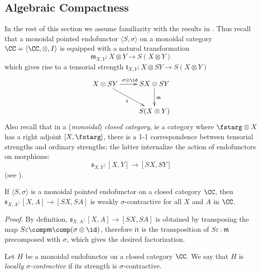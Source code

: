 \documentclass[11pt,a4paper]{article}
\newcommand{\tuple}[1]{\langle #1 \rangle }
\newcommand{\efunctor}{S}
\newcommand{\contr}{\sigma}
\newcommand{\pointedfunctor}{\tuple{\efunctor , \contr}}
\newcommand{\esse}{S}
\renewcommand{\strength}{\mathfrak{t}}
\newcommand{\stre}{\mathfrak{s}}
\newcommand{\monoi}{\mathfrak{m}}
\newcommand{\lolly}[2]{[#1 ,#2 ]}
\begin{document}
\subsection*{Algebraic Compactness}

In the rest of this section we assume
familiarity with the results in \cite{Kock}.
Thus recall that a monoidal pointed endofunctor $\pointedfunctor$
on a monoidal category $\CC = \tuple{\CC , \otimes , I}$
is equipped with
a natural transformation
$$\monoi_{X,Y} : X\otimes Y \rightarrow \esse (X\otimes Y)$$
which gives rise to a tensorial strength
$\strength_{X,Y} : X\otimes \esse Y \rightarrow \esse (X\otimes Y)$
$$\xymatrix{
X\otimes \esse Y \ar[r]^{\contr \otimes \id}  \ar[rd]_-{\strength}  
  & \esse X\otimes \esse Y \ar[d]^{\monoi}  
\\
& \esse (X\otimes Y)
}$$
Also recall that in a (\emph{monoidal}) \emph{closed category}, 
ie a category where $\fstarg \otimes X$ has
a right adjoint $\lolly{X}{\fstarg}$,
there is a 1-1 correspondence
between tensorial strengths and ordinary strengths;
the latter internalize the action of endofunctors on morphisms:
$$\stre_{X,Y} : \lolly{X}{Y}\rightarrow \lolly{\esse X}{\esse Y}$$
(see \cite[Thm 1.3]{Kock}).


\begin{lemma}
\label{exp}
If $\pointedfunctor$ 
is a monoidal pointed endofunctor
on a closed category $\CC$,
then 
$\stre_{X,A} : \lolly{X}{A}\rightarrow \lolly{\esse X}{\esse A}$
is weakly $\contr$-contractive for all $X$ and $A$ in $\CC$.

\emph{Proof.}
By definition, 
$\stre_{X,A} : \lolly{X}{A}\rightarrow \lolly{\esse X}{\esse A}$
is obtained by transposing the map
$S\varepsilon \comp \monoi \comp (\contr \otimes \id )$,
therefore it is the transposition of $S\varepsilon \comp \monoi$
precomposed with $\contr$, which gives the desired factorization.
\close
\end{lemma}

\begin{definition}
Let $H$ be a monoidal endofunctor on a closed 
category $\CC$.
We say that $H$ is \emph{locally $\contr$-contractive}
if its strength is $\contr$-contractive.
\end{definition}
\end{document}
